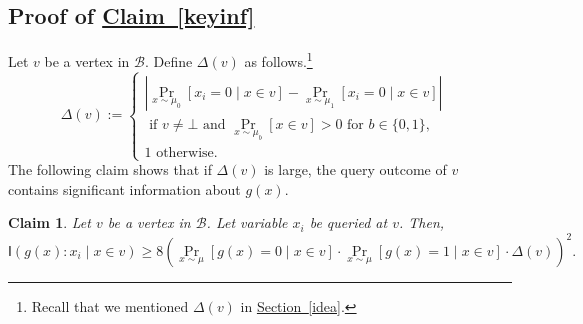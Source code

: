 \documentclass[11pt]{article}
\numberwithin{equation}{section}
\newtheorem{claim}[theorem]{Claim}
\theoremstyle{definition}
\theoremstyle{plain}
\newcommand{\expref}[2]{\hyperref[#2]{#1~\ref{#2}}}
\newcommand{\clB}{\mathcal{B}}
\newcommand{\I}{\mathsf{I}}
\begin{document}
\subsection{Proof of {\expref{Claim}{keyinf}}}
\label{key-inf}
Let $v$ be a vertex in $\clB$. Define $\Delta(v)$ as follows.\footnote{Recall that we mentioned $\Delta(v)$ in \expref{Section}{idea}.}
\[\Delta(v):=\left\{\begin{array}{lll}|\Pr_{x \sim \mu_0} [x_i=0 \mid x \in v]-\Pr_{x \sim \mu_1} [x_i=0 \mid x \in v]| &\\
\mbox{\ \ \ \ \ \ \ \ \ \ \ \ \ \ \ \ \ \ \ \ if $v \neq \bot$ and $\Pr_{x \sim \mu_b} [x \in v]>0$ for $b \in \{0,1\}$,} \\ 1\mbox{\ \ \ \ \ \ \ \ \ \ \ \ \ \ \ \ \ \ otherwise.} \end{array}\right.\]
The following claim shows that if $\Delta(v)$ is large, the query outcome of $v$ contains significant information about $g(x)$.
\begin{claim}
\label{mutin}
Let $v$ be a vertex in $\clB$. Let variable $x_i$ be queried at $v$. Then,
\[\I(g(x) : x_i \mid x \in v)  \geq 8 \left(\Pr_{x \sim \mu}[g(x)=0 \mid x \in v] \cdot \Pr_{x \sim \mu}[g(x)=1 \mid x \in v] \cdot \Delta(v)\right)^2.\]
\end{claim}
\end{document}
